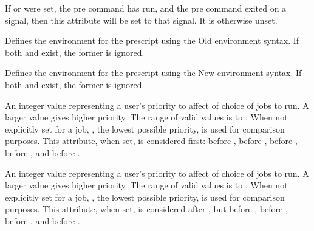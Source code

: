 \begin{description}
\item[\AdAttr{PreCmdExitSignal}:] If  or
 were set, the pre command has run,
and the pre command exited on a signal, then this attribute will
be set to that signal.  It is otherwise unset.

\item[\AdAttr{PreEnv}:] Defines the environment for the prescript
using the Old environment syntax. If both  and
 exist, the former is ignored.

\item[\AdAttr{PreEnvironment}:] Defines the environment for the prescript
using the New environment syntax. If both  and
 exist, the former is ignored.

\item[\AdAttr{PreJobPrio1}:]  An integer value representing a user's
priority to affect of choice of jobs to run.
A larger value gives higher priority. 
The range of valid values is   to .
When not explicitly set for a job,
, the lowest possible priority, is used for comparison purposes.
This attribute, when set, is considered first:
before , before ,
before , before ,
and before .

\item[\AdAttr{PreJobPrio2}:]  An integer value representing a user's
priority to affect of choice of jobs to run.
A larger value gives higher priority. 
The range of valid values is   to .
When not explicitly set for a job,
, the lowest possible priority, is used for comparison purposes.
This attribute, when set, is considered after , 
but before ,
before , before ,
and before .


\end{description}
